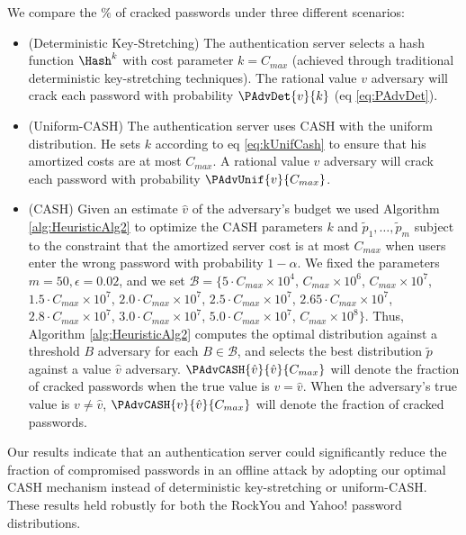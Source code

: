 We compare the $\%$ of cracked passwords under three different scenarios: 
\begin{itemize}
\item (Deterministic Key-Stretching) The authentication server selects a hash function $\Hash^k$  with cost parameter  $k = C_{max}$ (achieved through traditional deterministic key-stretching techniques). The rational value $v$ adversary will crack each password with probability $\PAdvDet{v}{k}$ (eq \ref{eq:PAdvDet}).   
\item (Uniform-CASH) The authentication server uses CASH with the uniform distribution. He sets $k$ according to eq \ref{eq:kUnifCash}
to ensure that his amortized costs are at most $C_{max}$. A rational value $v$ adversary will crack each password with probability $\PAdvUnif{v}{C_{max}}$. 

\item (CASH) Given an estimate $\hat{v}$ of the adversary's budget we used Algorithm \ref{alg:HeuristicAlg2} to optimize the CASH parameters $k$ and $\tilde{p}_1,\ldots, \tilde{p}_m$ subject to the constraint that the amortized server cost is at most $C_{max}$ when users enter the wrong password with probability $1-\alpha$. We fixed the parameters $m=50, \epsilon = 0.02$, and we set $\mathcal{B} = \{5\cdot C_{max} \times 10^4$, $C_{max}\times 10^6$, $C_{max}\times 10^7$, $1.5\cdot C_{max}\times 10^7$, $2.0\cdot C_{max} \times 10^7$,  $2.5\cdot C_{max} \times 10^7$, $2.65\cdot C_{max} \times 10^7$, $2.8\cdot C_{max} \times 10^7$, $3.0\cdot C_{max} \times 10^7$, $5.0\cdot C_{max} \times 10^7$, $C_{max} \times 10^8\}$. Thus, Algorithm \ref{alg:HeuristicAlg2} computes the optimal distribution against a threshold $B$ adversary for each $B \in \mathcal{B}$, and selects the best distribution $\tilde{p}$ against a value $\hat{v}$ adversary.  $\PAdvCASH{\hat{v}}{\hat{v}}{C_{max}}$ will denote the fraction of cracked passwords when the true value is $v=\hat{v}$. When the adversary's true value is $v \neq \hat{v}$, $\PAdvCASH{v}{\hat{v}}{C_{max}}$  will denote the fraction of cracked passwords.  
\end{itemize}

Our results indicate that an authentication server could significantly reduce the fraction of compromised passwords in an offline attack by adopting our optimal CASH mechanism instead of deterministic key-stretching or uniform-CASH. These results held robustly for both the RockYou and Yahoo! password distributions.






